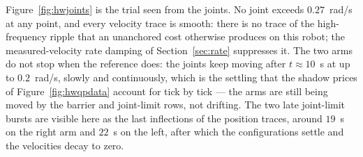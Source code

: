 Figure~\ref{fig:hwjoints} is the trial seen from the joints. No joint exceeds $0.27$~rad/s at any point, and every velocity trace is smooth: there is no trace of the high-frequency ripple that an unanchored cost otherwise produces on this robot; the measured-velocity rate damping of Section~\ref{sec:rate} suppresses it. The two arms do not stop when the reference does: the joints keep moving after $t\approx10$~s at up to $0.2$~rad/s, slowly and continuously, which is the settling that the shadow prices of Figure~\ref{fig:hwqpdata} account for tick by tick --- the arms are still being moved by the barrier and joint-limit rows, not drifting. The two late joint-limit bursts are visible here as the last inflections of the position traces, around $19$~s on the right arm and $22$~s on the left, after which the configurations settle and the velocities decay to zero.

